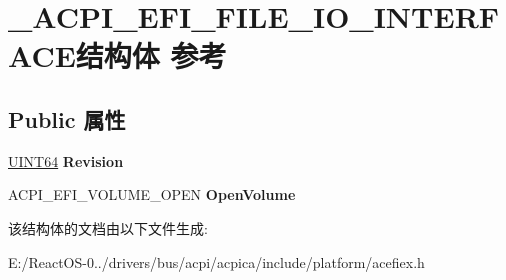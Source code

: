 \hypertarget{struct___a_c_p_i___e_f_i___f_i_l_e___i_o___i_n_t_e_r_f_a_c_e}{}\section{\+\_\+\+A\+C\+P\+I\+\_\+\+E\+F\+I\+\_\+\+F\+I\+L\+E\+\_\+\+I\+O\+\_\+\+I\+N\+T\+E\+R\+F\+A\+C\+E结构体 参考}
\label{struct___a_c_p_i___e_f_i___f_i_l_e___i_o___i_n_t_e_r_f_a_c_e}
\subsection*{Public 属性}
\begin{DoxyCompactItemize}
\item 
\mbox{\label{struct___a_c_p_i___e_f_i___f_i_l_e___i_o___i_n_t_e_r_f_a_c_e_ad0168a3bfdbc09866237f8943769c223}} 
\hyperlink{_processor_bind_8h_a57be03562867144161c1bfee95ca8f7c}{U\+I\+N\+T64} {\bfseries Revision}
\item 
\mbox{\label{struct___a_c_p_i___e_f_i___f_i_l_e___i_o___i_n_t_e_r_f_a_c_e_aff44fbbdcf3eb9c76ca185eb710219aa}} 
A\+C\+P\+I\+\_\+\+E\+F\+I\+\_\+\+V\+O\+L\+U\+M\+E\+\_\+\+O\+P\+EN {\bfseries Open\+Volume}
\end{DoxyCompactItemize}


该结构体的文档由以下文件生成\+:\begin{DoxyCompactItemize}
\item 
E\+:/\+React\+O\+S-\/0../drivers/bus/acpi/acpica/include/platform/acefiex.\+h\end{DoxyCompactItemize}
